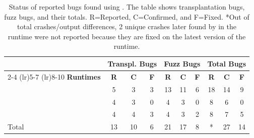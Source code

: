 \begin{table}[t]
    \centering
    \scriptsize
    \setlength{\tabcolsep}{8pt}
    \renewcommand{\arraystretch}{1}
    \setlength{\aboverulesep}{1pt}
    \setlength{\belowrulesep}{1pt}
    \caption{Status of reported bugs found using \tname{}. The table shows transplantation bugs, fuzz bugs, and their totals. R=Reported, C=Confirmed, and F=Fixed. *Out of total \TotalBugs{} crashes/output differences, 2 unique crashes later found by \lwdiff{} in the \wamr{} runtime were not reported because they are fixed on the latest version of the runtime.}
    \label{tab:bug_status}
    \begin{tabular}{@{}lccccccccc}
        \toprule
        & \multicolumn{3}{c}{\textbf{Transpl. Bugs}}
        & \multicolumn{3}{c}{\textbf{Fuzz Bugs}}
        & \multicolumn{3}{c}{\textbf{Total Bugs}} \\
        \cmidrule(lr){2-4}
        \cmidrule(lr){5-7}
        \cmidrule(lr){8-10}
        \textbf{Runtimes}
            & \textbf{R} & \textbf{C} & \textbf{F}
            & \textbf{R} & \textbf{C} & \textbf{F}
            & \textbf{R} & \textbf{C} & \textbf{F} \\
        \midrule
        \wasmer{}   & 5 & 3 & 3 & 13 & 11 & 6 & 18 & 14 & 9 \\
        \wamr{}     & 4 & 3 & 0 & 4  & 3  & 0 & 8  & 6  & 0 \\
        \wasmedge{} & 4 & 4 & 3 & 4  & 3  & 2 & 8  & 7  & 5 \\
        \midrule
        Total & 13 & 10 & 6 & 21 & 17 & 8
        & \cellcolor{lightgray}\ReportedBugs{}* & \cellcolor{lightgray}27 & \cellcolor{lightgray}14 \\
        \bottomrule
    \end{tabular}
\end{table}

